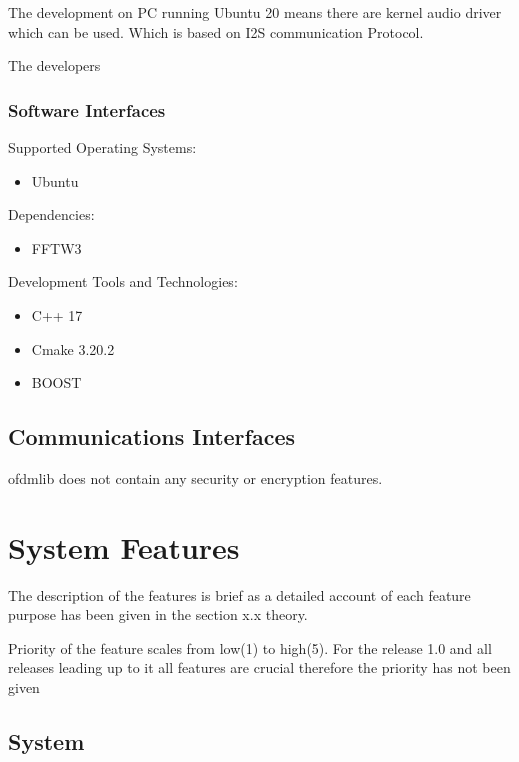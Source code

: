 \documentclass[]{report}
\begin{document}
The development on PC running Ubuntu 20 means there are kernel audio driver which can be used. Which is based on I2S communication Protocol.

The developers 

\subsubsection{Software Interfaces}


Supported Operating Systems:

\begin{itemize}
	\item Ubuntu
\end{itemize}

Dependencies:

\begin{itemize}
	\item FFTW3
\end{itemize}\textbf{}

Development Tools and Technologies:
\begin{itemize}
	\item C++ 17
	\item Cmake 3.20.2
	\item BOOST
\end{itemize}\textbf{}


\subsection{Communications Interfaces}

ofdmlib does not contain any security or encryption features.

\setlength{\parindent}{0em}
\setlength{\parskip}{1em}

\pagebreak
\section{System Features}

The description of the features is brief as a detailed account of each feature purpose has been given in the section x.x theory.

Priority of the feature scales from low(1) to high(5).
For the release 1.0 and all releases leading up to it all features are crucial therefore the priority has not been given

\subsection{System}
\end{document}
